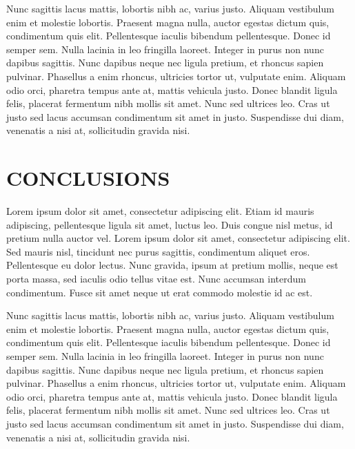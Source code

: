 \documentclass{sig-alternate}
\begin{document}
Nunc sagittis lacus mattis, lobortis nibh ac, varius justo. Aliquam vestibulum enim et molestie lobortis. Praesent magna nulla, auctor
egestas dictum quis, condimentum quis elit. Pellentesque iaculis bibendum pellentesque. Donec id semper sem. Nulla lacinia in leo fringilla 
laoreet. Integer in purus non nunc dapibus sagittis. Nunc dapibus neque nec ligula pretium, et rhoncus sapien pulvinar. Phasellus a enim rhoncus,
 ultricies tortor ut, vulputate enim. Aliquam odio orci, pharetra tempus ante at, mattis vehicula justo. Donec blandit ligula felis, placerat 
 fermentum nibh mollis sit amet. Nunc sed ultrices leo. Cras ut justo sed lacus accumsan condimentum sit amet in justo. Suspendisse dui diam, 
 venenatis a nisi at, sollicitudin gravida nisi.
 
\section{CONCLUSIONS}
\label{sec:conclusions}
Lorem ipsum dolor sit amet, consectetur adipiscing elit. Etiam id mauris adipiscing, pellentesque ligula sit amet, luctus leo. 
Duis congue nisl metus, id pretium nulla auctor vel. Lorem ipsum dolor sit amet, consectetur adipiscing elit. Sed mauris nisl, 
tincidunt nec purus sagittis, condimentum aliquet eros. Pellentesque eu dolor lectus. Nunc gravida, ipsum at pretium mollis, neque 
est porta massa, sed iaculis odio tellus vitae est. Nunc accumsan interdum condimentum. Fusce sit amet neque ut erat commodo molestie id ac est.

Nunc sagittis lacus mattis, lobortis nibh ac, varius justo. Aliquam vestibulum enim et molestie lobortis. Praesent magna nulla, auctor
egestas dictum quis, condimentum quis elit. Pellentesque iaculis bibendum pellentesque. Donec id semper sem. Nulla lacinia in leo fringilla 
laoreet. Integer in purus non nunc dapibus sagittis. Nunc dapibus neque nec ligula pretium, et rhoncus sapien pulvinar. Phasellus a enim rhoncus,
 ultricies tortor ut, vulputate enim. Aliquam odio orci, pharetra tempus ante at, mattis vehicula justo. Donec blandit ligula felis, placerat 
 fermentum nibh mollis sit amet. Nunc sed ultrices leo. Cras ut justo sed lacus accumsan condimentum sit amet in justo. Suspendisse dui diam, 
 venenatis a nisi at, sollicitudin gravida nisi.
 



\balancecolumns
\end{document}
